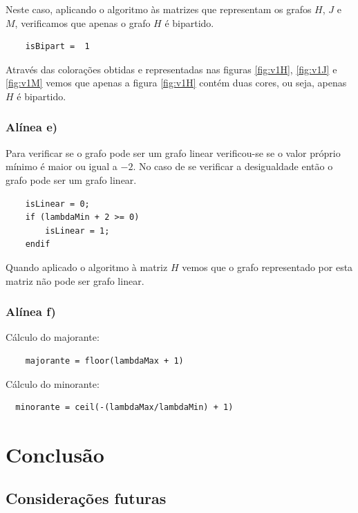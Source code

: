 \documentclass[a4paper,12pt]{report}
\begin{document}
Neste caso, aplicando o algoritmo às matrizes que representam os grafos $H$, $J$ e $M$, verificamos que apenas o grafo $H$ é bipartido. 

\begin{lstlisting}
    isBipart =  1
\end{lstlisting}

Através das colorações obtidas e representadas nas figuras \ref{fig:v1H}, \ref{fig:v1J} e \ref{fig:v1M} vemos que apenas a figura \ref{fig:v1H} contém duas cores, ou seja, apenas $H$ é bipartido.

\subsection*{Alínea e)}

Para verificar se o grafo pode ser um grafo linear verificou-se se o valor próprio mínimo é maior ou igual a $-2$. No caso de se verificar a desigualdade então o grafo pode ser um grafo linear.

\begin{lstlisting}
    isLinear = 0;
    if (lambdaMin + 2 >= 0)
        isLinear = 1;
    endif
\end{lstlisting}

Quando aplicado o algoritmo à matriz $H$ vemos que o grafo representado por esta matriz não pode ser grafo linear.

\subsection*{Alínea f)}

Cálculo do majorante:

\begin{lstlisting}
    majorante = floor(lambdaMax + 1)
\end{lstlisting}

Cálculo do minorante:

\begin{lstlisting}
  minorante = ceil(-(lambdaMax/lambdaMin) + 1)
\end{lstlisting}

\chapter{Conclusão}

\section{Considerações futuras}


\end{document}
